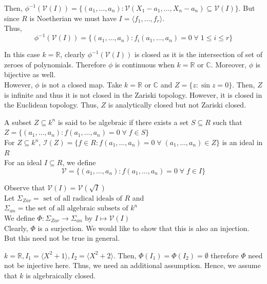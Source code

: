 \documentclass[oneside, 12pt]{scrbook}
\newcommand{\CC}{\mathbb C}
\newcommand{\RR}{\mathbb R}
\newcommand{\V}{\mathcal{V}}
\newcommand{\I}{\mathcal{I}}
\theoremstyle{theorem}
\begin{document}
Then, $\phi^{-1}(\V(I)) =\{(a_{1}, \hdots ,a_{n}):\V(X_{1}-a_{1}, \hdots , X_{n}-a_{n}) \subseteq \V(I)\}$. But since $R$ is Noetherian we must have $I = \langle f_{1}, \hdots , f_{r} \rangle$. \\

Thus, $$\phi^{-1}(\V(I)) = \{(a_{1}, \hdots ,a_{n}): f_{i}(a_{1}, \hdots , a_{n})= 0 \; \forall \; 1\le i \le r\}$$

In this case $k=\RR$, clearly $\phi^{-1}(\V(I))$ is closed as it is the intersection of set of zeroes of polynomials. Therefore $\phi$ is continuous when $k = \RR$ or $\CC$. Moreover, $\phi$ is bijective as well. \\

However, $\phi$ is not a closed map. Take $k = \RR$ or $\CC$ and $Z = \{z: \sin z=0\}$. Then, $Z$ is infinite and thus it is not closed in the Zariski topology. However, it is closed in the Euclidean topology. Thus, $Z$ is analytically closed but not Zariski closed.

\begin{definition}
A subset $Z \subseteq k^n$ is said to be algebraic if there exists a set $S \subseteq R$ such that $Z = \{(a_{1}, \hdots , a_{n}): f(a_{1}, \hdots , a_{n}) = 0 \; \forall \; f\in S\}$\\

For $Z\subseteq k^n$, $\I(Z) = \{f \in R: f(a_{1}, \hdots , a_{n})=0 \; \forall \; (a_{1}, \hdots ,a_{n}) \in Z\}$ is an ideal in $R$ \\

For an ideal $I \subseteq R$, we define $$\V = \{(a_{1}, \hdots , a_{n}): f(a_{1}, \hdots , a_{n}) = 0 \; \forall \; f\in I\}$$
\end{definition} 

Observe that $\V(I) = \V(\sqrt{I})$\\

Let $\Sigma_{Zar} = \text{ set of all radical ideals of }R$ and $\Sigma_{an} = \text{the set of all algebraic subsets of }k^n$\\

We define $\Phi: \Sigma_{Zar} \longrightarrow \Sigma_{an}$ by $I \mapsto \V(I)$\\

Clearly, $\Phi$ is a surjection. We would like to show that this is also an injection. But this need not be true in general.
\begin{example}
$k=\RR, I_{1}= \langle X^2 + 1 \rangle , I_{2} = \langle X^2 + 2 \rangle$. Then, $\Phi(I_{1}) = \Phi(I_{2}) = \emptyset$ therefore $\Phi$ need not be injective here. Thus, we need an additional assumption. Hence, we assume that $k$ is algebraically closed.
\end{example}
\end{document}
